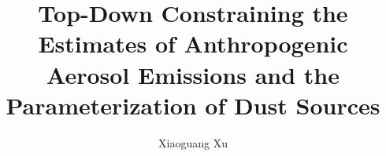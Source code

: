 \documentclass[phd, print]{nuthesis}
\begin{document}
\frontmatter

\title{Top-Down Constraining the Estimates of Anthropogenic Aerosol Emissions
       and the Parameterization of Dust Sources}
\author{Xiaoguang Xu}
\maketitle

%


\tableofcontents*
\begin{onehalfspacing}
\listoffigures
\listoftables
\end{onehalfspacing}

\mainmatter



\backmatter

\appendix
\end{document}
